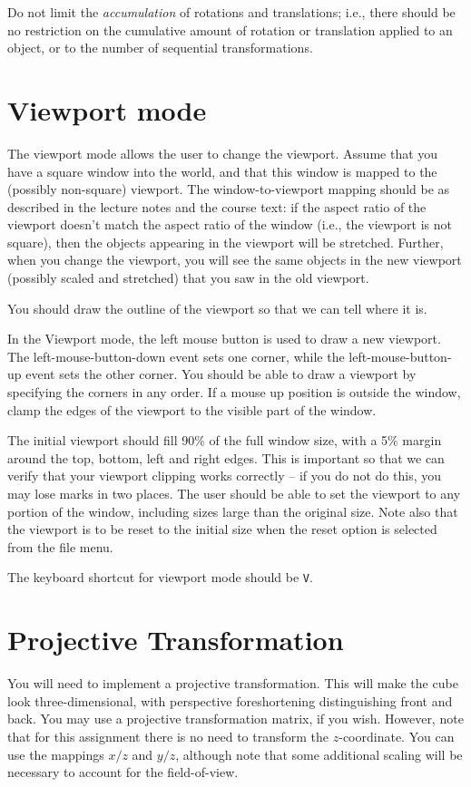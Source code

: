 Do not limit the {\it accumulation} of rotations and translations;
i.e., there should be no restriction on the
cumulative amount of rotation or translation applied to an object,
or to the number of sequential transformations.

\section{Viewport mode}
The viewport mode allows the user to change the viewport.  Assume that
you have a square window into the world, and that this window is
mapped to the (possibly non-square) viewport.  
The window-to-viewport mapping should be as described in the lecture
notes and the course text:
if the aspect ratio of the viewport doesn't match the aspect ratio
of the window (i.e., the viewport is not square), then the objects
appearing in the viewport will be stretched.  Further, when you
change the viewport, you will see the same objects in the new
viewport (possibly scaled and stretched) that you saw in the old 
viewport.

You should draw the outline of the viewport so that we can tell where 
it is.

In the Viewport mode, the left mouse button is used to draw a new
viewport.  The left-mouse-button-down event sets one corner, while
the left-mouse-button-up event sets the other corner.  You should be
able to draw a viewport by specifying the corners in any order.
If a mouse up position is outside the window, clamp the edges
of the viewport to the visible part of the window.

The initial viewport should fill 90\% of the full window size, with a
5\% margin around the top, bottom, left and right edges. This is
important so that we can verify that your viewport clipping works
correctly -- if you do not do this, you may lose marks in two places.
The user should be able to set the viewport to any portion of the
window, including sizes large than the original size. Note also that
the viewport is to be reset to the initial size when the reset option
is selected from the file menu.

The keyboard shortcut for viewport mode should be {\tt V}.

\section{Projective Transformation}
You will need to implement a projective transformation.  This will
make the cube look three-dimensional, with perspective foreshortening
distinguishing front and back.  You may use a projective
transformation matrix, if you wish.
However, note that for this assignment there is no need to transform
the $z$-coordinate.  You can use the mappings $x/z$ and $y/z$,
although note that some additional scaling will be necessary to
account for the field-of-view.


